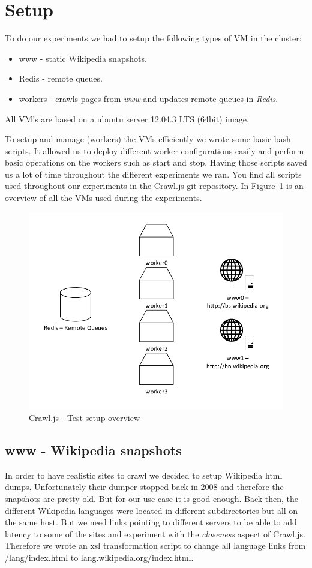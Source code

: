 \section{Setup}
To do our experiments we had to setup the following types of VM in the cluster:
\begin{itemize}
\item www - static Wikipedia snapshots.
\item Redis - remote queues.
\item workers - crawls pages from \emph{www} and updates remote queues in \emph{Redis}.
\end{itemize}
All VM's are based on a ubuntu server 12.04.3 LTS (64bit) image.

To setup and manage (workers) the VMs efficiently we wrote some basic bash scripts. It allowed us to deploy different worker configurations easily and perform basic operations on the workers such as start and stop. Having those scripts saved us a lot of time throughout the different experiments we ran. You find all scripts used throughout our experiments in the Crawl.js git repository. In Figure~\ref{test_setup} is an overview of all the VMs used during the experiments.

\begin{figure}[h]
\centering
  \includegraphics[width=1.0\textwidth]{Figures/experiments_setup.pdf}
\caption{Crawl.js - Test setup overview}
\label{test_setup}
\end{figure}

\subsection{www - Wikipedia snapshots}
In order to have realistic sites to crawl we decided to setup Wikipedia html dumps. Unfortunately their dumper stopped back in 2008 and therefore the snapshots are pretty old. But for our use case it is good enough. Back then, the different Wikipedia languages were located in different subdirectories but all on the same host. But we need links pointing to different servers to be able to add latency to some of the sites and experiment with the \emph{closeness} aspect of Crawl.js. Therefore we wrote an xsl transformation script to change all language links from /lang/index.html to lang.wikipedia.org/index.html.


